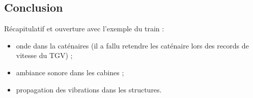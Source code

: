 \subsection{Conclusion}

\begin{slide}
Récapitulatif et ouverture avec l'exemple du train :
\begin{itemize}
\item onde dans la caténaires (il a fallu retendre les caténaire lors des records de vitesse du TGV) ;
\item ambiance sonore dans les cabines ;
\item propagation des vibrations dans les structures.
\end{itemize}
\end{slide}

\newpage